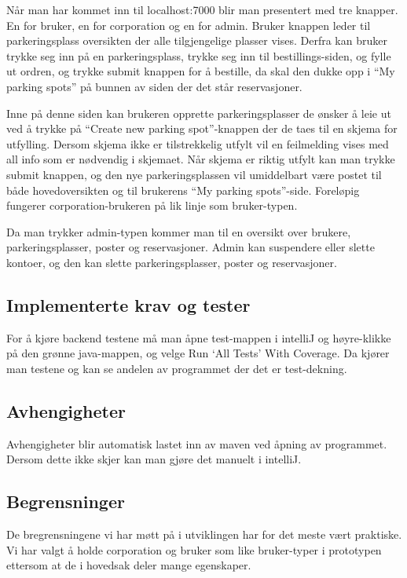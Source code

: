 \documentclass[12pt]{article}
\begin{document}
    Når man har kommet inn til localhost:7000 blir man presentert med tre knapper. En for bruker, en for corporation og en for admin. Bruker knappen leder til parkeringsplass oversikten der alle tilgjengelige plasser vises. Derfra kan bruker trykke seg inn på en parkeringsplass, trykke seg inn til bestillings-siden, og fylle ut ordren, og trykke submit knappen for å bestille, da skal den dukke opp i “My parking spots” på bunnen av siden der det står reservasjoner.
    
    Inne på denne siden kan brukeren opprette parkeringsplasser de ønsker å leie ut ved å trykke på “Create new parking spot”-knappen der de taes til en skjema for utfylling. Dersom skjema ikke er tilstrekkelig utfylt vil en feilmelding vises med all info som er nødvendig i skjemaet. Når skjema er riktig utfylt kan man trykke submit knappen, og den nye parkeringsplassen vil umiddelbart være postet til både hovedoversikten og til brukerens “My parking spots”-side. Foreløpig fungerer corporation-brukeren på lik linje som bruker-typen.
    
    Da man trykker admin-typen kommer man til en oversikt over brukere, parkeringsplasser, poster og reservasjoner. Admin kan suspendere eller slette kontoer, og den kan slette parkeringsplasser, poster og reservasjoner.

    \subsection{Implementerte krav og tester}
    For å kjøre backend testene må man åpne test-mappen i intelliJ og høyre-klikke på den grønne java-mappen, og velge Run ‘All Tests’ With Coverage. Da kjører man testene og kan se andelen av programmet der det er test-dekning.

    \subsection{Avhengigheter}
    Avhengigheter blir automatisk lastet inn av maven ved åpning av programmet. Dersom dette ikke skjer kan man gjøre det manuelt i intelliJ.

    \subsection{Begrensninger}
    De bregrensningene vi har møtt på i utviklingen har for det meste vært praktiske. Vi har valgt å holde corporation og bruker som like bruker-typer i prototypen ettersom at de i hovedsak deler mange egenskaper.
    
\end{document}
